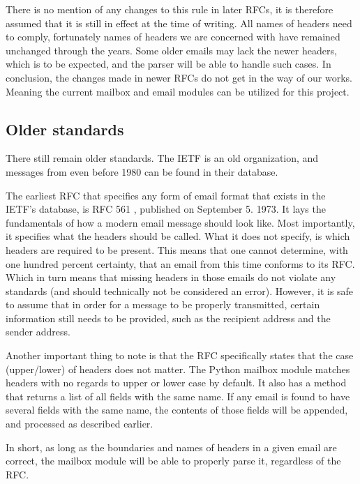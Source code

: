 \documentclass[a4paper,english]{report}
\begin{document}
There is no mention of any changes to this rule in later RFCs, it is therefore assumed that it is still in effect at the time of writing.
All names of headers need to comply, fortunately names of headers we are concerned with have remained unchanged through the years. Some older emails may lack the newer headers, which is to be expected, and the parser will be able to handle such cases.
In conclusion, the changes made in newer RFCs do not get in the way of our works. Meaning the current mailbox and email modules can be utilized for this project.



\subsection{Older standards}

There still remain older standards. The IETF is an old organization, and messages from even before 1980 can be found in their database.

The earliest RFC that specifies any form of email format that exists in the IETF's database, is RFC 561 \cite{RFC0561}, published on September 5. 1973. It lays the fundamentals of how a modern email message should look like. Most importantly, it specifies what the headers should be called. What it does not specify, is which headers are required to be present. This means that one cannot determine, with one hundred percent certainty, that an email from this time conforms to its RFC. Which in turn means that missing headers in those emails do not violate any standards (and should technically not be considered an error).
However, it is safe to assume that in order for a message to be properly transmitted, certain information still needs to be provided, such as the recipient address and the sender address.

Another important thing to note is that the RFC specifically states that the case (upper/lower) of headers does not matter. The Python mailbox module matches headers with no regards to upper or lower case by default. It also has a method that returns a list of all fields with the same name. If any email is found to have several fields with the same name, the contents of those fields will be appended, and processed as described earlier.

In short, as long as the boundaries and names of headers in a given email are correct, the mailbox module will be able to properly parse it, regardless of the RFC.
\end{document}

